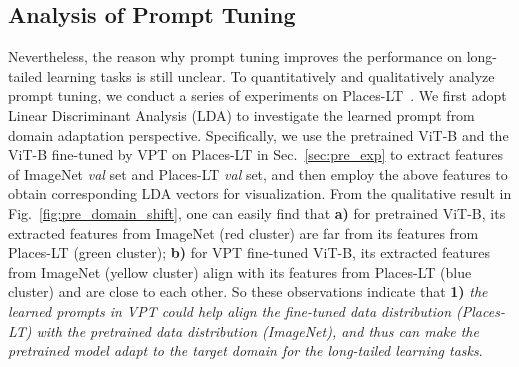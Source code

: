 \documentclass{article} \usepackage{iclr2023_conference,times}
\begin{document}
\subsection{Analysis of Prompt Tuning}\label{sec:pre_analysis}
\vspace{-0.4em}
Nevertheless, the reason why prompt tuning improves the performance on long-tailed learning tasks is still unclear. 
To quantitatively and qualitatively analyze prompt tuning, we conduct a series of experiments on Places-LT~\citep{zhou2017places}. 
We first adopt Linear Discriminant Analysis (LDA) to investigate the learned prompt from domain adaptation  perspective. 
Specifically, we use the pretrained ViT-B and the  ViT-B fine-tuned by VPT on Places-LT in Sec.~\ref{sec:pre_exp} to extract features of ImageNet \textit{val} set and Places-LT \textit{val} set, and then employ the above features to obtain corresponding LDA vectors for visualization. 
From the qualitative result in Fig.~\ref{fig:pre_domain_shift}, one can easily find that \textbf{a)} for pretrained ViT-B, its extracted features from ImageNet (red cluster) are far from its features  from Places-LT (green cluster); \textbf{b)} for VPT  fine-tuned ViT-B, its extracted features from ImageNet (yellow cluster) align with its features  from Places-LT (blue cluster) and are close to each other. So these observations indicate that \textbf{1)} \textit{the learned prompts in VPT could help align the fine-tuned data distribution (Places-LT) with the pretrained data distribution (ImageNet), and thus can make the pretrained model adapt to the target domain for the long-tailed learning tasks}.
\end{document}
